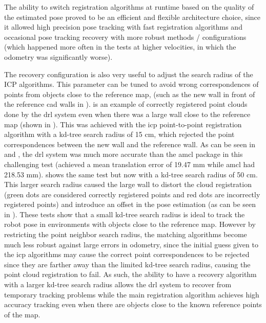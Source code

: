 The ability to switch registration algorithms at runtime based on the quality of the estimated pose proved to be an efficient and flexible architecture choice, since it allowed high precision pose tracking with fast registration algorithms and occasional pose tracking recovery with more robust methods / configurations (which happened more often in the tests at higher velocities, in which the odometry was significantly worse).

The recovery configuration is also very useful to adjust the search radius of the ICP algorithms. This parameter can be tuned to avoid wrong correspondences of points from objects close to the reference map, (such as the new wall in front of the reference \gls{cad} walls in ).  is an example of correctly registered point clouds done by the \gls{drl} system even when there was a large wall close to the reference map (shown in ). This was achieved with the \gls{icp} point-to-point registration algorithm with a kd-tree search radius of 15 cm, which rejected the point correspondences between the new wall and the reference wall. As can be seen in  and , the \gls{drl} system was much more accurate than the \gls{amcl} package in this challenging test (achieved a mean translation error of 19.47 mm while \gls{amcl} had 218.53 mm).  shows the same test but now with a kd-tree search radius of 50 cm. This larger search radius caused the large wall to distort the cloud registration (green dots are considered correctly registered points and red dots are incorrectly registered points) and introduce an offset in the pose estimation (as can be seen in ). These tests show that a small kd-tree search radius is ideal to track the robot pose in environments with objects close to the reference map. However by restricting the point neighbor search radius, the matching algorithms become much less robust against large errors in odometry, since the initial guess given to the \gls{icp} algorithms may cause the correct point correspondences to be rejected since they are farther away than the limited kd-tree search radius, causing the point cloud registration to fail. As such, the ability to have a recovery algorithm with a larger kd-tree search radius allows the \gls{drl} system to recover from temporary tracking problems while the main registration algorithm achieves high accuracy tracking even when there are objects close to the known reference points of the map.


